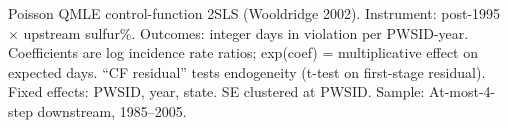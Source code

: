 \par \raggedright 
Poisson QMLE control-function 2SLS (Wooldridge 2002). Instrument: post-1995 $\times$ upstream sulfur\%. Outcomes: integer days in violation per PWSID-year. Coefficients are log incidence rate ratios; exp(coef) = multiplicative effect on expected days. ``CF residual'' tests endogeneity (t-test on first-stage residual). Fixed effects: PWSID, year, state. SE clustered at PWSID. Sample: At-most-4-step downstream, 1985--2005.
\par\endgroup


